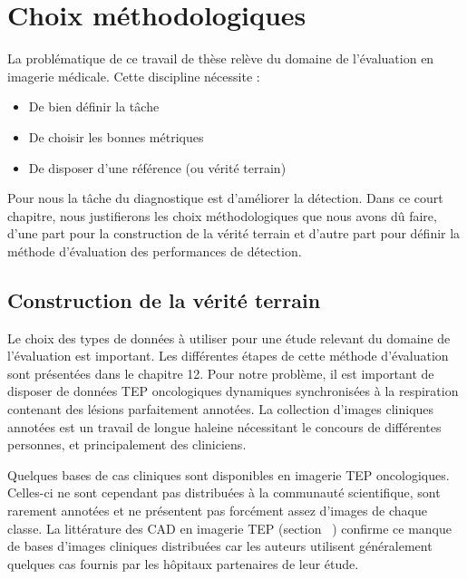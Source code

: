 \chapter{Choix méthodologiques}


La problématique de ce travail de thèse relève du domaine de l'évaluation en imagerie médicale. Cette discipline nécessite :

\begin{itemize}
 \item De bien définir la tâche
 \item De choisir les bonnes métriques
 \item De disposer d'une référence (ou vérité terrain)
\end{itemize}

Pour nous la tâche du diagnostique est d'améliorer la détection. Dans ce court chapitre, nous justifierons les choix méthodologiques que nous avons dû faire, d'une part pour la construction de la vérité terrain et d'autre part pour définir la méthode d'évaluation des performances de détection.

\section{Construction de la vérité terrain}

Le choix des types de données à utiliser pour une étude relevant du domaine de l'évaluation est important. Les différentes étapes de cette méthode d'évaluation sont présentées dans le chapitre 12. Pour notre problème, il est important de disposer de données TEP oncologiques dynamiques synchronisées à la respiration contenant des lésions parfaitement annotées. La collection d’images cliniques annotées est un travail de longue haleine nécessitant le concours de différentes personnes, et principalement des cliniciens. 


Quelques bases de cas cliniques sont disponibles en imagerie TEP oncologiques. Celles-ci ne sont cependant pas distribuées à la communauté scientifique, sont rarement annotées et ne présentent pas forcément assez d’images de chaque classe. La littérature des CAD en imagerie TEP (section ~\cite{lab:CADTEP}) confirme ce manque de bases d’images cliniques distribuées car les auteurs utilisent généralement quelques cas fournis par les hôpitaux partenaires de leur étude. 

